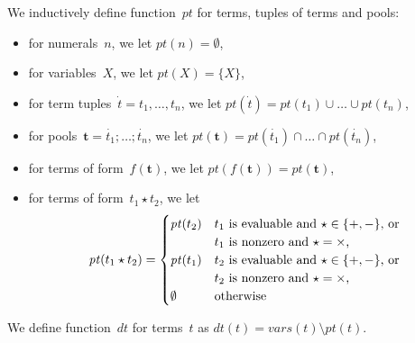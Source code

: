 \documentclass{article}
\newcommand{\pool}[1]{\boldsymbol{#1}}
\newcommand{\tuple}[1]{\dot{#1}}
\newcommand{\set}[1]{\{#1\}}
\newcommand\Vars{\mathit{vars}}
\newcommand\Provide{\mathit{pt}}
\newcommand\Depend{\mathit{dt}}
\begin{document}
	We inductively define function~$\Provide$ for terms, tuples of terms and pools:
	\begin{itemize}
		\item
			for numerals~$n$, we let
			$\Provide(n) = \emptyset$,
		\item
			for variables~$X$, we let
			$\Provide(X) = \set{X}$,
		\item
			for term tuples~$\tuple{t} = t_1,\dots,t_n$, we let
			$\Provide(\tuple{t}) = \Provide(t_1) \cup \dots \cup \Provide(t_n)$,
		\item
			for pools~$\pool{t} = \tuple{t_1};\dots;\tuple{t_n}$, we let
			$\Provide(\pool{t}) = \Provide(\tuple{t_1}) \cap \dots \cap \Provide(\tuple{t_n})$,
		\item
			for terms of form~$f(\pool{t})$, we let
			$\Provide(f(\pool{t})) = \Provide(\pool{t})$,
		\item
			for terms of form~$t_1 \star t_2$, we let
				\begin{align*}
				\Provide(t_1 \star t_2) = \begin{cases}
					\Provide(t_2) & \text{\shortstack[l]{$t_1$ is evaluable and ${\star} \in \set{{+}, {-}}$}, or}\\
					              & \text{\shortstack[l]{$t_1$ is nonzero and ${\star} = {\times}$,}}\\
					\Provide(t_1) & \text{\shortstack[l]{$t_2$ is evaluable and ${\star} \in \set{{+}, {-}}$}, or}\\
					              & \text{\shortstack[l]{$t_2$ is nonzero and ${\star} = {\times}$,}}\\
					\emptyset & \text{otherwise}
				\end{cases}
				\end{align*}
	\end{itemize}
	We define function~$\Depend$ for terms~$t$ as $\Depend(t) = \Vars(t) \setminus \Provide(t)$.
\end{document}
